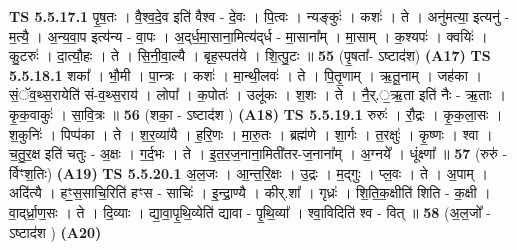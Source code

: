 \documentclass[17pt]{extarticle}
\begin{document}
                                \textbf{ TS 5.5.17.1} \newline
                  पृ॒ष॒तः । वै॒श्व॒दे॒व इति॑ वैश्व - दे॒वः । पि॒त्वः । न्यङ्कुः॑ । कशः॑ । ते । अनु॑मत्या॒ इत्यनु॑ - म॒त्यै॒ । अ॒न्य॒वा॒प इत्य॑न्य - वा॒पः । अ॒द्‌र्ध॒मा॒साना॒मित्य॑द्‌र्ध - मा॒साना᳚म् । मा॒साम् । क॒श्यपः॑ । क्वयिः॑ । कु॒टरुः॑ । दा॒त्यौ॒हः । ते । सि॒नी॒वा॒ल्यै । बृह॒स्पत॑ये । शि॒त्पु॒टः ॥ \textbf{  55 } \newline
                  \newline
                      (पृ॒षता᳚- ऽष्टाद॑श)  \textbf{(A17)} \newline \newline
                                \textbf{ TS 5.5.18.1} \newline
                  शका᳚ । भौ॒मी । पा॒न्त्रः । कशः॑ । मा॒न्थी॒लवः॑ । ते । पि॒तृ॒णाम् । ऋ॒तू॒नाम् । जह॑का । सं॒ॅव॒थ्स॒रायेति॑ सं-व॒थ्स॒राय॑ । लोपा᳚ । क॒पोतः॑ । उलू॑कः । श॒शः । ते । नै॒र्.॒ऋ॒ता इति॑ नैः - ऋ॒ताः । कृ॒क॒वाकुः॑ । सा॒वि॒त्रः ॥ \textbf{  56 } \newline
                  \newline
                      (शका॒ - ऽष्टाद॑श )  \textbf{(A18)} \newline \newline
                                \textbf{ TS 5.5.19.1} \newline
                  रुरुः॑ । रौ॒द्रः । कृ॒क॒ला॒सः । श॒कुनिः॑ । पिप्प॑का । ते । श॒र॒व्या॑यै । ह॒रि॒णः । मा॒रु॒तः । ब्रह्म॑णे । शा॒र्गः । त॒रक्षुः॑ । कृ॒ष्णः । श्वा । च॒तु॒र॒क्ष इति॑ चतुः - अ॒क्षः । ग॒र्द॒भः । ते । इ॒त॒र॒ज॒नाना॒मिती॑तर-ज॒नाना᳚म् । अ॒ग्नये᳚ । धूंक्ष्णा᳚ ॥ \textbf{  57 } \newline
                  \newline
                      (रुरु॑ - र्विꣳश॒तिः)  \textbf{(A19)} \newline \newline
                                \textbf{ TS 5.5.20.1} \newline
                  अ॒ल॒जः । आ॒न्त॒रि॒क्षः । उ॒द्रः । म॒द्गुः । प्ल॒वः । ते । अ॒पाम् । अदि॑त्यै । हꣳ॒॒स॒साचि॒रिति॑ हꣳस - साचिः॑ । इ॒न्द्रा॒ण्यै । कीर्.शा᳚ । गृध्रः॑ । शि॒ति॒क॒क्षीति॑ शिति - क॒क्षी । वा॒द्‌र्ध्रा॒ण॒सः । ते । दि॒व्याः । द्या॒वा॒पृ॒थि॒व्येति॑ द्यावा - पृ॒थि॒व्या᳚ । श्वा॒विदिति॑ श्व - वित् ॥ \textbf{  58 } \newline
                  \newline
                      (अ॒ल॒जो᳚ - ऽष्टाद॑श )  \textbf{(A20)} \newline \newline
\end{document}
